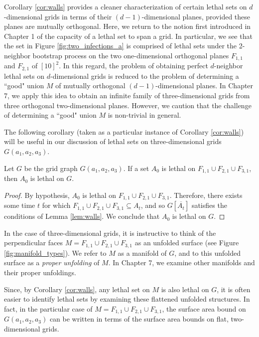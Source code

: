 Corollary \ref{cor:walls} provides a cleaner characterization of certain lethal sets on $d$-dimensional grids in terms of their $(d-1)$-dimensional planes, provided these planes are mutually orthogonal. Here, we return to the notion first introduced in Chapter 1 of the capacity of a lethal set to span a grid. In particular, we see that the set in Figure \ref{fig:two_infections_a} is comprised of lethal sets under the 2-neighbor bootstrap process on the two one-dimensional orthogonal planes $F_{1,1}$ and $F_{2,1}$ of $[10]^2$. In this regard, the problem of obtaining perfect $d$-neighbor lethal sets on $d$-dimensional grids is reduced to the problem of determining a ``good" union $M$ of mutually orthogonal $(d-1)$-dimensional planes. 
In Chapter 7, we apply this idea to obtain an infinite family of three-dimensional grids from three orthogonal two-dimensional planes. However, we caution that the challenge of determining a ``good" union $M$ is non-trivial in general.

The following corollary (taken as a particular instance of Corollary \ref{cor:walls}) will be useful in our discussion of lethal sets on three-dimensional grids $G(a_1,a_2,a_3)$. 

\begin{cor}
\label{cor:three_walls}
Let $G$ be the grid graph $G(a_1,a_2,a_3)$. If a set $A_0$ is lethal on $F_{1,1} \cup F_{2,1} \cup F_{3,1}$, then $A_0$ is lethal on $G$.
\end{cor}

\begin{proof}
By hypothesis, $A_0$ is lethal on $F_{1,1} \cup F_{2,1} \cup F_{3,1}$. Therefore, there exists some time $t$ for which $F_{1,1} \cup F_{2,1} \cup F_{3,1} \subseteq A_t$, and so $G[\overline{A_t}]$ satisfies the conditions of Lemma \ref{lem:walls}. We conclude that $A_0$ is lethal on $G$.
\end{proof}

In the case of three-dimensional grids, it is instructive to think of the perpendicular faces $M = F_{1,1} \cup F_{2,1} \cup F_{3,1}$ as an unfolded surface (see Figure \ref{fig:manifold_types}). We refer to $M$ as a manifold of $G$, and to this unfolded surface as a \emph{proper unfolding} of $M$. In Chapter 7, we examine other manifolds and their proper unfoldings. 

Since, by Corollary \ref{cor:walls}, any lethal set on $M$ is also lethal on $G$, it is often easier to identify lethal sets by examining these flattened unfolded structures. In fact, in the particular case of $M = F_{1,1} \cup F_{2,1} \cup F_{3,1}$, the surface area bound on $G(a_1,a_2,a_3)$ can be written in terms of the surface area bounds on flat, two-dimensional grids.

